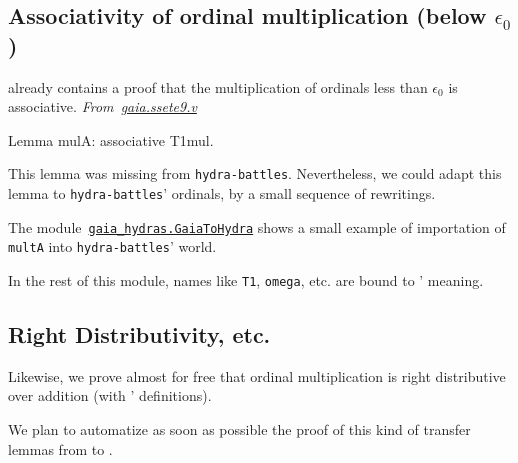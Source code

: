 \subsection{Associativity of ordinal multiplication (below \texorpdfstring{$\epsilon_0$}{epsilon\_0})}
\gaia already contains a proof that the multiplication of ordinals less than $\epsilon_0$ is associative.
\emph{From~\href{https://github.com/coq-community/gaia/blob/master/theories/ssete9.v}{gaia.ssete9.v}}

\begin{Coqsrc}
Lemma mulA: associative T1mul.
\end{Coqsrc}

This lemma was missing from \texttt{hydra-battles}. Nevertheless, we could adapt this lemma to \texttt{hydra-battles}' ordinals, by a small sequence of rewritings.


The module~\href{../theories/html/gaia_hydras.GaiaToHydra.html}%
{\texttt{gaia\_hydras.GaiaToHydra}} shows a small
example of importation of \texttt{multA} into \texttt{hydra-battles}' world.


In the rest of this module, names like  \texttt{T1}, \texttt{omega}, etc. are  bound to \HydrasLib' meaning.


 \subsection{Right Distributivity, etc.}
 Likewise, we prove almost for free that ordinal multiplication is right distributive over addition (with \HydrasLib' definitions).


We plan to automatize as soon as possible the proof of this kind of transfer lemmas from \gaia to \HydrasLib.








